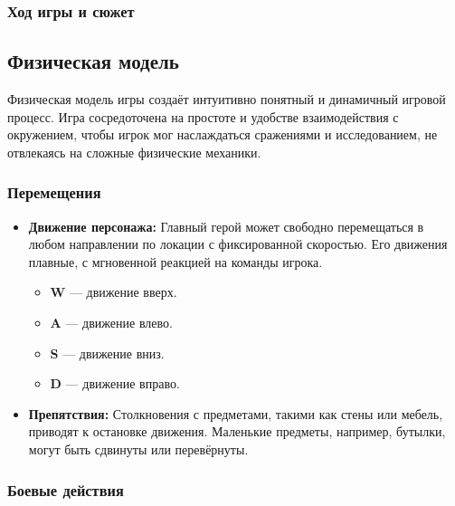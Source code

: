 \documentclass[12pt]{article}
\begin{document}
        \subsubsection{Ход игры и сюжет}
        
    \subsection{Физическая модель}

        Физическая модель игры создаёт интуитивно понятный и динамичный игровой процесс. Игра сосредоточена на простоте и удобстве взаимодействия с окружением, чтобы игрок мог наслаждаться сражениями и исследованием, не отвлекаясь на сложные физические механики.
        
        \subsubsection{Перемещения}
        
        \begin{itemize}
            \item \textbf{Движение персонажа:} Главный герой может свободно перемещаться в любом направлении по локации с фиксированной скоростью. Его движения плавные, с мгновенной реакцией на команды игрока.
            \begin{itemize}
                \item \textbf{W} — движение вверх.
                \item \textbf{A} — движение влево.
                \item \textbf{S} — движение вниз.
                \item \textbf{D} — движение вправо.
            \end{itemize}
            \item \textbf{Препятствия:} Столкновения с предметами, такими как стены или мебель, приводят к остановке движения. Маленькие предметы, например, бутылки, могут быть сдвинуты или перевёрнуты.
        \end{itemize}
        
        \subsubsection{Боевые действия}
        
\end{document}
